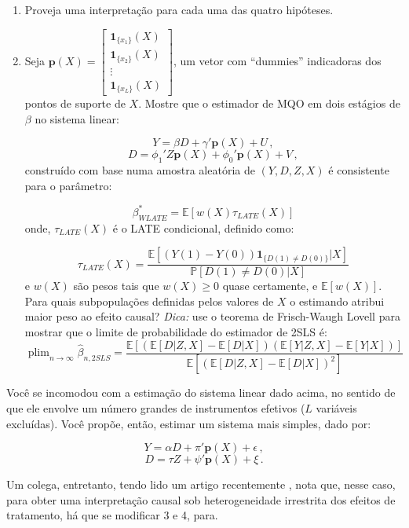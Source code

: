\documentclass[10pt,a4paper]{article}
\begin{document}
\begin{enumerate}
	\item[a] Proveja uma interpretação para cada uma das quatro hipóteses.
	\item[b] Seja $\boldsymbol{p}(X) = \begin{bmatrix}
		\mathbf{1}_{\{x_1\}}(X) \\
		\mathbf{1}_{\{x_2\}}(X) \\
		\vdots \\
		\mathbf{1}_{\{x_L\}}(X) 
	\end{bmatrix}$, um vetor com ``dummies'' indicadoras dos pontos de suporte de $X$. Mostre que o estimador de MQO em dois estágios de $\beta$ no sistema linear:
	
	$$Y = \beta D + \gamma' \boldsymbol{p}(X) + U\, , $$
		$$D = \phi_1'Z \boldsymbol{p}(X)  + \phi_0' \boldsymbol{p}(X) + V\, ,$$
		construído com base numa amostra aleatória de $(Y,D,Z,X)$ é consistente para o parâmetro:
		
		$$\beta^*_{WLATE} = \mathbb{E}[w(X)\tau_{LATE}(X)]$$
		onde, $\tau_{LATE}(X)$ é o LATE condicional, definido como:
		
		$$\tau_{LATE}(X) = \frac{\mathbb{E}[(Y(1)-Y(0))\mathbf{1}_{\{D(1)\neq D(0)\}}|X]}{\mathbb{P}[D(1)\neq D(0)|X]}$$
		e $w(X)$ são pesos tais que $w(X) \geq 0$ quase certamente, e $\mathbb{E}[w(X)]$. Para quais subpopulações definidas pelos valores de $X$ o estimando atribui maior peso ao efeito causal? \textit{Dica:} use o teorema de Frisch-Waugh Lovell para mostrar que o limite de probabilidade do estimador de 2SLS é:
		$$\operatorname{plim}_{n \to \infty} \hat \beta_{n,2SLS} = \frac{\mathbb{E}[(\mathbb{E}[D|Z,X]-\mathbb{E}[D|X])(\mathbb{E}[Y|Z,X]-\mathbb{E}[Y|X])]}{\mathbb{E}[(\mathbb{E}[D|Z,X]-\mathbb{E}[D|X])^2]}$$
	\end{enumerate}
		\vspace{0.5em}
		
Você se incomodou com a estimação do sistema linear dado acima, no sentido de que ele envolve um número grandes de instrumentos efetivos ($L$ variáveis excluídas). Você propõe, então, estimar um sistema mais simples, dado por:

	$$Y = \alpha D + \pi' \boldsymbol{p}(X) + \epsilon\, , $$
$$D = \tau Z   + \psi' \boldsymbol{p}(X) + \xi \, .$$

Um colega, entretanto, tendo lido um artigo recentemente \citep{blandhol2022tsls}, nota que, nesse caso, para obter uma interpretação causal sob heterogeneidade irrestrita dos efeitos de tratamento, há que se modificar 3 e 4, para.
\end{document}
